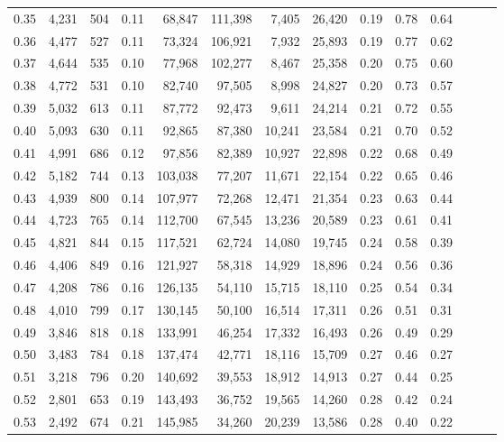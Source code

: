 \begin{tabular}{rrrrrrrrrrrrrr}
0.35 &  4,231 &  504 &  0.11 &   68,847 &  111,398 &   7,405 &  26,420 &  0.19 &  0.78 &      0.64 \\
0.36 &  4,477 &  527 &  0.11 &   73,324 &  106,921 &   7,932 &  25,893 &  0.19 &  0.77 &      0.62 \\
0.37 &  4,644 &  535 &  0.10 &   77,968 &  102,277 &   8,467 &  25,358 &  0.20 &  0.75 &      0.60 \\
0.38 &  4,772 &  531 &  0.10 &   82,740 &   97,505 &   8,998 &  24,827 &  0.20 &  0.73 &      0.57 \\
0.39 &  5,032 &  613 &  0.11 &   87,772 &   92,473 &   9,611 &  24,214 &  0.21 &  0.72 &      0.55 \\
0.40 &  5,093 &  630 &  0.11 &   92,865 &   87,380 &  10,241 &  23,584 &  0.21 &  0.70 &      0.52 \\
0.41 &  4,991 &  686 &  0.12 &   97,856 &   82,389 &  10,927 &  22,898 &  0.22 &  0.68 &      0.49 \\
0.42 &  5,182 &  744 &  0.13 &  103,038 &   77,207 &  11,671 &  22,154 &  0.22 &  0.65 &      0.46 \\
0.43 &  4,939 &  800 &  0.14 &  107,977 &   72,268 &  12,471 &  21,354 &  0.23 &  0.63 &      0.44 \\
0.44 &  4,723 &  765 &  0.14 &  112,700 &   67,545 &  13,236 &  20,589 &  0.23 &  0.61 &      0.41 \\
0.45 &  4,821 &  844 &  0.15 &  117,521 &   62,724 &  14,080 &  19,745 &  0.24 &  0.58 &      0.39 \\
0.46 &  4,406 &  849 &  0.16 &  121,927 &   58,318 &  14,929 &  18,896 &  0.24 &  0.56 &      0.36 \\
0.47 &  4,208 &  786 &  0.16 &  126,135 &   54,110 &  15,715 &  18,110 &  0.25 &  0.54 &      0.34 \\
0.48 &  4,010 &  799 &  0.17 &  130,145 &   50,100 &  16,514 &  17,311 &  0.26 &  0.51 &      0.31 \\
0.49 &  3,846 &  818 &  0.18 &  133,991 &   46,254 &  17,332 &  16,493 &  0.26 &  0.49 &      0.29 \\
0.50 &  3,483 &  784 &  0.18 &  137,474 &   42,771 &  18,116 &  15,709 &  0.27 &  0.46 &      0.27 \\
0.51 &  3,218 &  796 &  0.20 &  140,692 &   39,553 &  18,912 &  14,913 &  0.27 &  0.44 &      0.25 \\
0.52 &  2,801 &  653 &  0.19 &  143,493 &   36,752 &  19,565 &  14,260 &  0.28 &  0.42 &      0.24 \\
0.53 &  2,492 &  674 &  0.21 &  145,985 &   34,260 &  20,239 &  13,586 &  0.28 &  0.40 &      0.22 \\

\end{tabular}
